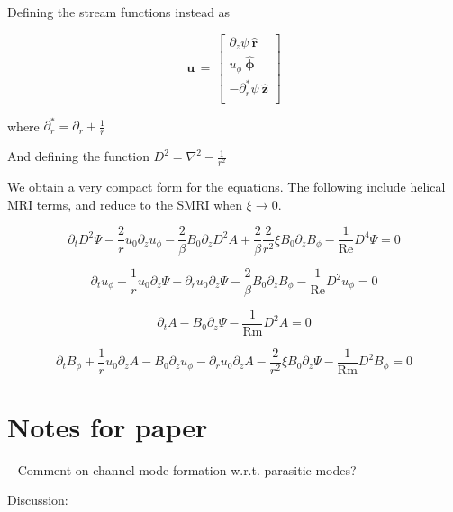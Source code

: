 \documentclass{paper}
\newcommand{\beq}{\begin{equation}}
\newcommand{\eeq}{\end{equation}}
\newcommand{\uphi}{\ensuremath{u_\phi}}
\newcommand{\rhat}{\ensuremath{\mathbf{\hat{r}}}}
\newcommand{\phihat}{\ensuremath{\mathbf{\hat{\phi}}}}
\newcommand{\zhat}{\ensuremath{\mathbf{\hat{z}}}}
\newcommand\reye{\mathrm{Re}}
\newcommand\reym{\mathrm{Rm}}
\begin{document}
Defining the stream functions instead as 

\begin{equation}
  \label{eq:stokes}
  \mathbf{u} \, = \, \left[\begin{matrix}
\partial_z \psi\ \rhat\\
\uphi \ \phihat\\
- \partial_r^* \psi\ \zhat\\
\end{matrix}\right]
\end{equation}

where $\partial_r^* = \partial_r + \frac{1}{r}$

And defining the function $D^2 = \nabla^2 - \frac{1}{r^2}$

We obtain a very compact form for the equations. The following include helical MRI terms, and reduce to the SMRI when $\xi \rightarrow 0$.

\beq
\partial_t D^2 \Psi - \frac{2}{r}u_0\partial_z u_\phi - \frac{2}{\beta} B_0 \partial_z D^2 A + \frac{2}{\beta} \frac{2}{r^2} \xi B_0 \partial_z B_\phi - \frac{1}{\reye} D^4 \Psi = 0
\eeq

\beq
\partial_t u_\phi + \frac{1}{r} u_0 \partial_z \Psi + \partial_r u_0 \partial_z \Psi - \frac{2}{\beta} B_0 \partial_z B_\phi - \frac{1}{\reye} D^2 u_{\phi} = 0
\eeq

\beq
\partial_t A - B_0 \partial_z \Psi - \frac{1}{\reym} D^2 A = 0
\eeq

\beq
\partial_t B_\phi + \frac{1}{r}u_0 \partial_z A - B_0 \partial_z u_\phi - \partial_r u_0 \partial_z A - \frac{2}{r^2} \xi B_0 \partial_z \Psi - \frac{1}{\reym} D^2 B_\phi = 0
\eeq

\section{Notes for paper}

-- Comment on channel mode formation w.r.t. parasitic modes?

Discussion:


\end{document}
